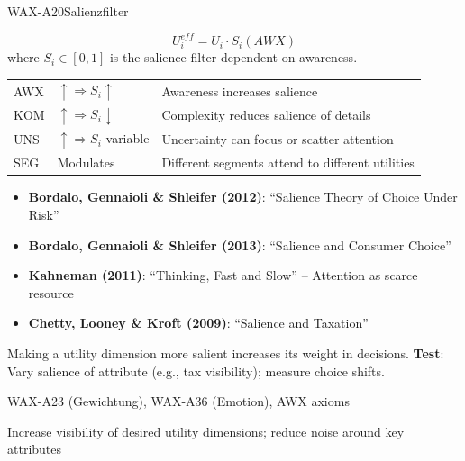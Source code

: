 
\begin{axiomspec}{WAX-A20}{Salienzfilter}

\begin{equation}
U_i^{eff} = U_i \cdot S_i(AWX)
\end{equation}
where $S_i \in [0,1]$ is the salience filter dependent on awareness.

\begin{tabular}{lll}
AWX & $\uparrow \Rightarrow S_i \uparrow$ & Awareness increases salience \\
KOM & $\uparrow \Rightarrow S_i \downarrow$ & Complexity reduces salience of details \\
UNS & $\uparrow \Rightarrow S_i$ variable & Uncertainty can focus or scatter attention \\
SEG & Modulates & Different segments attend to different utilities \\
\end{tabular}

\begin{itemize}
\item \textbf{Bordalo, Gennaioli \& Shleifer (2012)}: ``Salience Theory of Choice Under Risk''
\item \textbf{Bordalo, Gennaioli \& Shleifer (2013)}: ``Salience and Consumer Choice''
\item \textbf{Kahneman (2011)}: ``Thinking, Fast and Slow'' -- Attention as scarce resource
\item \textbf{Chetty, Looney \& Kroft (2009)}: ``Salience and Taxation''
\end{itemize}

Making a utility dimension more salient increases its weight in decisions.
\textbf{Test}: Vary salience of attribute (e.g., tax visibility); measure choice shifts.

WAX-A23 (Gewichtung), WAX-A36 (Emotion), AWX axioms

Increase visibility of desired utility dimensions; reduce noise around key attributes

\end{axiomspec}


